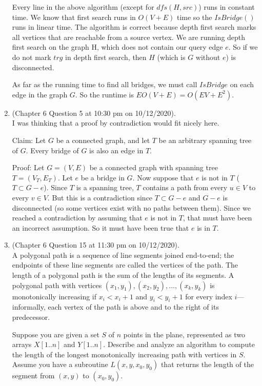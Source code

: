 \documentclass{article}
\begin{document}
\begin{enumerate}
        Every line in the above algorithm (except for $dfs(H, src)$) runs in constant time. We know that first search runs in $O(V + E)$ time so the $IsBridge()$ runs in linear time. The algorithm is correct because depth first search marks all vertices that are reachable from a source vertex. We are running depth first search on the graph H, which does not contain our query edge $e$. So if we do not mark $trg$ in depth first search, then $H$ (which is $G$ without $e$) is disconnected.

        As far as the running time to find all bridges, we must call $IsBridge$ on each edge in the graph $G$. So the runtime is $EO(V + E) = O(EV + E^2)$.
    \item (Chapter 6 Question 5 at 10:30 pm on 10/12/2020). \\
        I was thinking that a proof by contradiction would fit nicely here.

        Claim: Let $G$ be a connected graph, and let $T$ be an arbitrary spanning tree of $G$.
        Every bridge of $G$ is also an edge in $T$.

        Proof: Let $G = (V, E)$ be a connected graph with spanning tree $T = (V_T, E_T)$.
        Let $e$ be a bridge in $G$.
        Now suppose that $e$ is not in $T$ ($T \subset G - e$).
        Since $T$ is a spanning tree, $T$ contains a path from every $u \in V$ to every $v \in V$.
        But this is a contradiction since $T \subset G - e$ and $G- e$ is disconnected (so some vertices exist with no paths between them).
        Since we reached a contradiction by assuming that $e$ is not in $T$, that must have been an incorrect assumption.
        So it must have been true that $e$ is in $T$.
    \item (Chapter 6 Question 15 at 11:30 pm on 10/12/2020). \\
        A polygonal path is a sequence of line segments joined end-to-end; the endpoints of these line segments are called the vertices of the path.
        The length of a polygonal path is the sum of the lengths of its segments.
        A polygonal path with vertices $(x_1, y_1), (x_2, y_2), ... ,(x_k, y_k)$ is monotonically increasing if $x_i < x_i+1$ and $y_i < y_i+1$ for every index $i$—informally, each vertex of the path is above and to the right of its predecessor.

        Suppose you are given a set $S$ of $n$ points in the plane, represented as two arrays $X[1 .. n]$ and $Y [1 .. n]$.
        Describe and analyze an algorithm to compute the length of the longest monotonically increasing path with vertices in $S$.
        Assume you have a subroutine $L(x, y, x_0, y_0)$ that returns the length of the segment from $(x, y)$ to $(x_0, y_0)$.
\end{enumerate}
\end{document}
